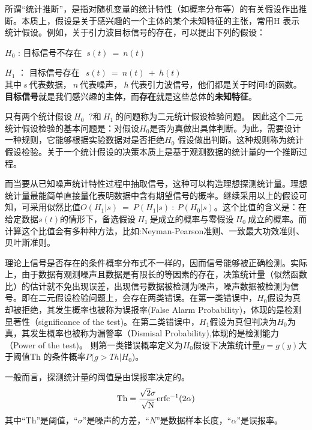 所谓“统计推断”，是指对随机变量的统计特性（如概率分布等）的有关假设作出推断。本质上，假设是关于感兴趣的一个主体的某个未知特征的主张，常用H 表示统计假设。例如，关于引力波目标信号的存在，可以提出下列的假设：

$H_0$ : 目标信号不存在 $\ s(t)\ =\ n(t)$

$H_1$  ： 目标信号存在\  $\ s(t)\ =\ n(t)\ +\ h(t)$\\
其中$\ s\ $代表数据，$\ n\ $代表噪声，$\ h\ $代表引力波信号，他们都是关于时间$t$的函数。{\bfseries{目标信号}}就是我们感兴趣的{\bfseries{主体}}，而{\bfseries{存在}}就是这些总体的{\bfseries{未知特征}}。

只有两个统计假设$\ H_0\ $ ?和$\ H_1\ $的问题称为二元统计假设检验问题。%
因此这个二元统计假设检验的基本问题是：对假设$H_0$是否为真做出具体判断。为此，需要设计一种规则，它能够根据实验数据对是否拒绝$H_0$ 假设做出判断。这种规则称为统计假设检验。关于一个统计假设的决策本质上是基于观测数据的统计量的一个推断过程。




而当要从已知噪声统计特性过程中抽取信号，这种可以构造理想探测统计量。理想统计量最能简单直接量化表明数据中含有期望信号的概率。继续采用以上的假设可知，可采用似然比值$ O(H_1|s)\ =\ P(H_1|s)\ :\ P(H_0|s)$。这个比值的含义是：在给定数据$s(t)$的情形下，备选假设$\ H_1\ $是成立的概率与零假设$\ H_0\ $成立的概率。而计算这个比值会有多种种方法，比如:Neyman-Pearson准则、一致最大功效准则、贝叶斯准则。%

理论上信号是否存在的条件概率分布式不一样的，因而信号能够被正确检测。实际上，由于数据有观测噪声且数据是有限长的等因素的存在，决策统计量（似然函数比）的估计就不免出现误差，出现信号数据被检测为噪声，噪声数据被检测为信号。即在二元假设检验问题上，会存在两类错误。在第一类错误中，$H_0$假设为真却被拒绝，其发生概率也被称为误报率(False Alarm Probability)，体现的是检测显著性（significance of the test)。在第二类错误中，$H_1$假设为真但判决为$H_0$为真，其发生概率也被称为漏警率（Dismisal Probability),体现的是检测能力（Power of the test)。
则第一类错误概率定义为$H_0$假设下决策统计量$g=g(y)$大于阈值Th 的条件概率$P(g>Th|H_0$)。

一般而言，探测统计量的阈值是由误报率决定的。
\begin{equation}
\rm Th = \frac{\sqrt{2}\sigma}{\sqrt{N}} \rm erfc^{-1} (2\alpha)
\label{eq:threshold}
\end{equation}
其中``Th''是阈值，``$\sigma$''是噪声的方差，``$N$''是数据样本长度，``$\alpha$''是误报率。

